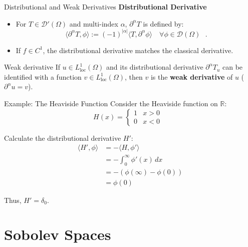 \documentclass[aspectratio=169]{beamer}
\begin{document}
\begin{frame}{Distributional and Weak Derivatives}
    \textbf{Distributional Derivative}
    \begin{itemize}
        \item For $T \in \mathcal{D}'(\Omega)$ and multi-index $\alpha$, $\partial^\alpha T$ is defined by:
        \[
            \langle \partial^\alpha T, \phi \rangle := (-1)^{|\alpha|} \langle T, \partial^\alpha \phi \rangle \quad \forall \phi \in \mathcal{D}(\Omega) \text{ }.
        \]
        \item If $f \in C^1$, the distributional derivative matches the classical derivative.
    \end{itemize}

    \vspace{0.3cm}
    \begin{block}{Weak derivative}
        If $u \in L^1_{\text{loc}}(\Omega)$ and its distributional derivative $\partial^\alpha T_u$ can be identified with a function $v \in L^1_{\text{loc}}(\Omega)$, then $v$ is the \textbf{weak derivative} of $u$ ($\partial^\alpha u = v$).
    \end{block}
\end{frame}

\begin{frame}{Example: The Heaviside Function}
    Consider the Heaviside function on $\mathbb{R}$:
    \[
        H(x) = 
        \begin{cases} 
            1 & x > 0 \\ 
            0 & x < 0 
        \end{cases} \text{ }
    \]
    
    Calculate the distributional derivative $H'$:
    \begin{align*}
        \langle H', \phi \rangle &= - \langle H, \phi' \rangle \\
        &= - \int_0^\infty \phi'(x) \, dx \text{ } \\
        &= - (\phi(\infty) - \phi(0)) \\
        &= \phi(0) \text{ }
    \end{align*}
    
    Thus, $H' = \delta_0$.
\end{frame}

\section{Sobolev Spaces}
\end{document}
